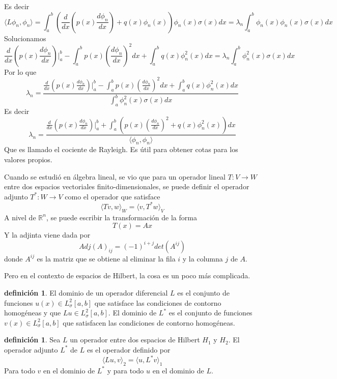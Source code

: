 \documentclass[11pt]{book}
\theoremstyle{plain}
\theoremstyle{definition}
\newtheorem{defi}[proposición]{definición}
\newcommand{\R}{\mathbb{R}}
\begin{document}
\begin{enumerate}
\[        \]
        Es decir
        \[
            \langle L \phi_{n}, \phi_{n} \rangle = \int_{a}^{b} \left(\frac{d}{dx}\left(p(x)\frac{d\phi_{n}}{dx}\right) + q(x)\phi_{n}(x)\right)\phi_{n}(x)\sigma(x)dx = \lambda_{n}\int_{a}^{b} \phi_{n}(x)\phi_{n}(x)\sigma(x)dx
        \]
        Solucionamos
        \[
            \frac{d}{dx}\left(p(x)\frac{d\phi_{n}}{dx}\right)|_{a}^{b} - \int_{a}^{b} p(x)\left(\frac{d\phi_{n}}{dx}\right)^{2}dx + \int_{a}^{b} q(x)\phi_{n}^{2}(x)dx = \lambda_{n}\int_{a}^{b} \phi_{n}^{2}(x)\sigma(x)dx
        \]
        Por lo que
        \[
            \lambda_{n} = \frac{\frac{d}{dx}\left(p(x)\frac{d\phi_{n}}{dx}\right)|_{a}^{b} - \int_{a}^{b} p(x)\left(\frac{d\phi_{n}}{dx}\right)^{2}dx + \int_{a}^{b} q(x)\phi_{n}^{2}(x)dx}{\int_{a}^{b} \phi_{n}^{2}(x)\sigma(x)dx}
        \]
        Es decir
        \[
            \lambda_{n} = \frac{\frac{d}{dx}\left(p(x)\frac{d\phi_{n}}{dx}\right)|_{a}^{b} + \int_{a}^{b} \left(p(x)\left(\frac{d\phi_{n}}{dx}\right)^{2} + q(x)\phi_{n}^{2}(x)\right)dx}{\langle \phi_{n}, \phi_{n} \rangle}
        \]
        Que es llamado el cociente de Rayleigh. Es útil para obtener cotas para los valores propios.
    \end{enumerate}

    Cuando se estudió en álgebra lineal, se vio que para un operador lineal $T: V \to W$ entre dos espacios vectoriales finito-dimensionales, se puede definir el operador adjunto $T^{*}: W \to V$ como el operador que satisface
    \[
        \langle Tv, w \rangle_{W} = \langle v, T^{*}w \rangle_{V}
    \]
    A nivel de $\R^{n}$, se puede escribir la transformación de la forma
    \[
        T(x) = Ax
    \]
    Y la adjinta viene dada por
    \[
        Adj(A)_{ij} = (-1)^{i+j}det(A^{ij})
    \]
    donde $A^{ij}$ es la matriz que se obtiene al eliminar la fila $i$ y la columna $j$ de $A$.

    Pero en el contexto de espacios de Hilbert, la cosa es un poco más complicada.
    \begin{defi}
        El dominio de un operador diferencial $L$ es el conjunto de funciones $u(x) \in L^{2}_{\sigma}[a,b]$ que satisface las condiciones de contorno homogéneas y que $Lu \in L^{2}_{\sigma}[a,b]$. El dominio de $L^{*}$ es el conjunto de funciones $v(x) \in L^{2}_{\sigma}[a,b]$ que satisfacen las condiciones de contorno homogéneas.
    \end{defi}

    \begin{defi}
        Sea $L$ un operador entre dos espacios de Hilbert $H_{1}$ y $H_{2}$. El operador adjunto $L^{*}$ de $L$ es el operador definido por
        \[
            \langle Lu, v \rangle_{2} = \langle u, L^{*}v \rangle_{1}
        \]
        Para todo $v$ en el dominio de $L^{*}$ y para todo $u$ en el dominio de $L$.
    \end{defi}
\end{document}
